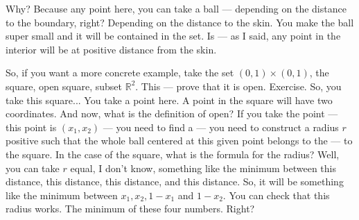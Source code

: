 \begin{spoken-clean}[00:06:15 - 00:08:37]
Why? Because any point here, you can take a ball --- depending on the distance to the boundary, right? Depending on the distance to the skin. You make the ball super small and it will be contained in the set. Is --- as I said, any point in the interior will be at positive distance from the skin.

So, if you want a more concrete example, take the set $(0, 1) \times (0, 1)$, the square, open square, subset $\mathbb{R}^2$. This --- prove that it is open. Exercise. So, you take this square...  You take a point here. A point in the square will have two coordinates. And now, what is the definition of open? If you take the point --- this point is $(x_1, x_2)$ --- you need to find a --- you need to construct a radius $r$ positive such that the whole ball centered at this given point belongs to the --- to the square. In the case of the square, what is the formula for the radius? Well, you can take $r$ equal, I don't know, something like the minimum between this distance, this distance, this distance, and this distance. So, it will be something like the minimum between $x_1, x_2, 1 - x_1$ and $1 - x_2$. You can check that this radius works. The minimum of these four numbers. Right?
\end{spoken-clean}

